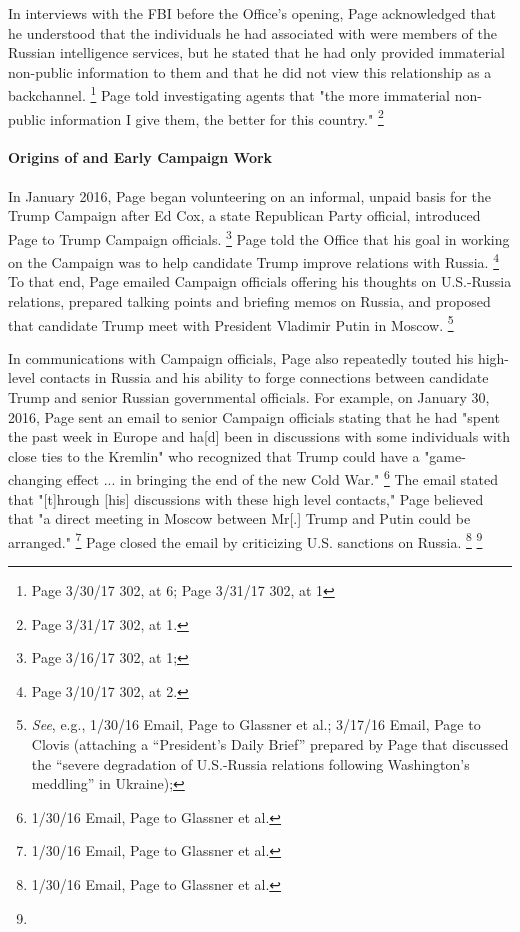 In interviews with the FBI before the Office's opening, Page acknowledged that he understood that the individuals he had associated with were members of the Russian intelligence services, but he stated that he had only provided immaterial non-public information to them and that he did not view this relationship as a backchannel.%
\footnote{Page 3/30/17 302, at 6; Page 3/31/17 302, at 1}
Page told investigating agents that "the more immaterial non-public information I give them, the better for this country."%
\footnote{Page 3/31/17 302, at 1.}

\paragraph{Origins of and Early Campaign Work}

In January 2016, Page began volunteering on an informal, unpaid basis for the Trump Campaign after Ed Cox, a state Republican Party official, introduced Page to Trump Campaign officials.%
\footnote{Page 3/16/17 302, at 1; }
Page told the Office that his goal in working on the Campaign was to help candidate Trump improve relations with Russia.%
\footnote{Page 3/10/17 302, at 2.}
To that end, Page emailed Campaign officials offering his thoughts on U.S.-Russia relations, prepared talking points and briefing memos on Russia, and proposed that candidate Trump meet with President Vladimir Putin in Moscow.%
\footnote{\textit{See}, e.g., 1/30/16 Email, Page to Glassner et al.;
3/17/16 Email, Page to Clovis (attaching a “President’s Daily Brief” prepared by Page that discussed the “severe degradation of U.S.-Russia relations following Washington’s meddling” in Ukraine); }

In communications with Campaign officials, Page also repeatedly touted his high-level contacts in Russia and his ability to forge connections between candidate Trump and senior Russian governmental officials.
For example, on January 30, 2016, Page sent an email to senior Campaign officials stating that he had "spent the past week in Europe and ha[d] been in discussions with some individuals with close ties to the Kremlin" who recognized that Trump could have a "game-changing effect ... in bringing the end of the new Cold War."%
\footnote{1/30/16 Email, Page to Glassner et al.}
The email stated that "[t]hrough [his] discussions with these high level contacts," Page believed that "a direct meeting in Moscow between Mr[.] Trump and Putin could be arranged."%
\footnote{1/30/16 Email, Page to Glassner et al.}
Page closed the email by criticizing U.S. sanctions on Russia.%
\footnote{1/30/16 Email, Page to Glassner et al.}
\footnote{}

